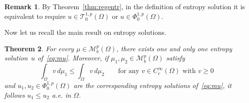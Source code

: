 \documentclass[twoside,reqno]{amsart}
\numberwithin{equation}{section}
\newtheorem{thm}{Theorem}[section]
\theoremstyle{definition}
\newtheorem{rem}[thm]{Remark}
\begin{document}
%
\begin{rem}
\label{rem:equiv}
By Theorem~\ref{thm:regentr}, in the definition of
entropy solution it is equivalent to require
$u\in \mathcal{T}^{1,p}_0(\Omega)$ or
$u\in \Phi^{1,p}_0(\Omega)$.
\end{rem}
%
Now let us recall the main result on entropy solutions.
%
\begin{thm}
\label{thm:mu}
For every $\mu\in \mathcal{M}_b^p(\Omega)$, there exists one 
and only one entropy solution~$u$ of~\eqref{eq:mu}.
Moreover, if $\mu_1, \mu_2\in \mathcal{M}_b^p(\Omega)$ satisfy
\[
\int_\Omega v\,d\mu_1 \leq \int_\Omega v\,d\mu_2
\qquad\text{for any $v\in C^{\infty}_c(\Omega)$ with $v\geq 0$}
\]
and $u_1, u_2\in \Phi^{1,p}_0(\Omega)$ are the corresponding
entropy solutions of~\eqref{eq:mu},
it follows $u_1\leq u_2$ a.e. in $\Omega$.
\end{thm}
%
\end{document}

